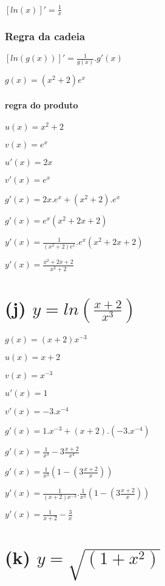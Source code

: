 \([ln(x)]'=\frac{1}{x}\)

\hypertarget{regra-da-cadeia}{%
\subsubsection{Regra da cadeia}\label{regra-da-cadeia}}

\([ln(g(x))]'=\frac{1}{g(x)}.g'(x)\)

\(g(x) = (x^2+2)e^{x}\)

\hypertarget{regra-do-produto-2}{%
\paragraph{regra do produto}\label{regra-do-produto-2}}

\(u(x) = x^2+2\)

\(v(x) = e^x\)

\(u'(x) = 2x\)

\(v'(x) = e^x\)

\(g'(x) = 2x.e^x+(x^2+2).e^x\)

\(g'(x)=e^x(x^2+2x+2)\)

\(y'(x)=\frac{1}{(x^2+2)e^{x}}.e^x(x^2+2x+2)\)

\(y'(x) =\frac{x^2+2x+2}{x^2+2}\)

\hypertarget{j-y-lnfracx2x3}{%
\section{\texorpdfstring{(j)
\(y =ln(\frac{x+2}{x^3})\)}{(j) y =ln(\textbackslash{}frac\{x+2\}\{x\^{}3\})}}\label{j-y-lnfracx2x3}}

\(g(x) = (x+2){x^{-3}}\)

\(u(x) = x + 2\)

\(v(x) = x^{-3}\)

\(u'(x) = 1\)

\(v'(x) = -3.x^{-4}\)

\(g'(x) = 1.x^{-3} + (x+2).(-3.x^{-4})\)

\(g'(x) = \frac{1}{x^3} - 3\frac{x+2}{x^4}\)

\(g'(x) = \frac{1}{x^3}(1-(3\frac{x+2}{x}))\)

\(y'(x) = \frac{1}{(x+2){x^{-3}}}.\frac{1}{x^3}(1-(3\frac{x+2}{x}))\)

\(y'(x) = \frac{1}{x+2}-\frac{3}{x}\)

\hypertarget{k-y-sqrt1x2}{%
\section{\texorpdfstring{(k)
\(y = \sqrt{(1+x^2)}\)}{(k) y = \textbackslash{}sqrt\{(1+x\^{}2)\}}}\label{k-y-sqrt1x2}}

